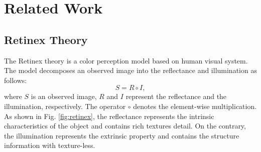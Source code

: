 \chapter{Related Work}
\label{sec:related}

\section{Retinex Theory} \label{sec:retinex}
The Retinex theory \cite{retinex} is a color perception model based on human visual system. The model decomposes an observed image into the reflectance and illumination as follows:
\begin{equation}
S = R \circ I,\label{eq:retinex}
\end{equation}
where $S$ is an observed image, $R$ and $I$ represent the reflectance and the illumination, respectively. The operator $\circ$ denotes the element-wise multiplication. As shown in Fig. \ref{fig:retinex}, the reflectance represents the intrinsic characteristics of the object and contains rich textures detail. On the contrary, the illumination represents the extrinsic property and contains the structure information with texture-less.

